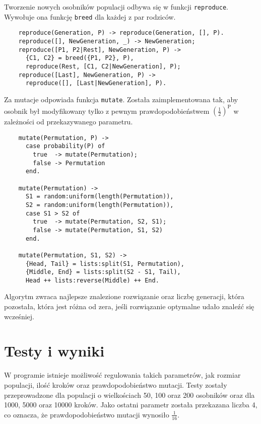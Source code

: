   Tworzenie nowych osobników populacji odbywa się w funkcji \texttt{reproduce}.
  Wywołuje ona funkcję \texttt{breed} dla każdej z par rodziców.
  \singlespacing
  \begin{center}
  \begin{verbatim}
    reproduce(Generation, P) -> reproduce(Generation, [], P).
    reproduce([], NewGeneration, _) -> NewGeneration;
    reproduce([P1, P2|Rest], NewGeneration, P) ->
      {C1, C2} = breed({P1, P2}, P),
      reproduce(Rest, [C1, C2|NewGeneration], P);
    reproduce([Last], NewGeneration, P) ->
      reproduce([], [Last|NewGeneration], P).
  \end{verbatim}
  \end{center}
  \onehalfspacing
  \vspace{1em}

  Za mutacje odpowiada funkcja \texttt{mutate}. Została zaimplementowana tak,
  aby osobnik był modyfikowany tylko z pewnym prawdopodobieństwem
  $(\frac{1}{2})^\textrm{P}$ w zależności od przekazywanego parametru.
  \singlespacing
  \begin{center}
  \begin{verbatim}
    mutate(Permutation, P) ->
      case probability(P) of
        true  -> mutate(Permutation);
        false -> Permutation
      end.

    mutate(Permutation) ->
      S1 = random:uniform(length(Permutation)),
      S2 = random:uniform(length(Permutation)),
      case S1 > S2 of
        true  -> mutate(Permutation, S2, S1);
        false -> mutate(Permutation, S1, S2)
      end.

    mutate(Permutation, S1, S2) ->
      {Head, Tail} = lists:split(S1, Permutation),
      {Middle, End} = lists:split(S2 - S1, Tail),
      Head ++ lists:reverse(Middle) ++ End.
  \end{verbatim}
  \end{center}
  \onehalfspacing
  \vspace{1em}

  Algorytm zwraca najlepsze znalezione rozwiązanie oraz liczbę generacji, która
  pozostała, która jest różna od zera, jeśli rozwiązanie optymalne udało znaleźć
  się wcześniej.

\section{Testy i wyniki} %
  \label{sec:testy}

  W programie istnieje możliwość regulowania takich parametrów, jak rozmiar
  populacji, ilość kroków oraz prawdopodobieństwo mutacji. Testy zostały
  przeprowadzone dla populacji o wielkościach 50, 100 oraz 200 osobników oraz
  dla 1000, 5000 oraz 10000 kroków. Jako ostatni parametr została przekazana
  liczba 4, co oznacza, że prawdopodobieństwo mutacji wynosiło $\frac{1}{16}$.
  \vspace{1em}

